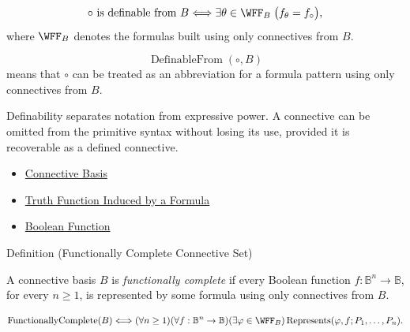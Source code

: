 \begin{remark*}
\[
\circ\text{ is definable from }B
\Longleftrightarrow
\exists\theta\in\WFF_B\;\bigl(f_{\theta}=f_{\circ}\bigr),
\]
where \(\WFF_B\) denotes the formulas built using only connectives from \(B\).
\end{remark*}

\begin{remark*}
\[
  \operatorname{DefinableFrom}(\circ,B)
\] means that \(\circ\) can be treated as
an abbreviation for a formula pattern using only connectives from \(B\).
\end{remark*}

\begin{remark*}[Interpretation]
Definability separates notation from expressive power. A connective can be
omitted from the primitive syntax without losing its use, provided it is
recoverable as a defined connective.
\end{remark*}

\begin{dependencies}
\begin{itemize}
  \item \hyperref[def:connective-basis-propositional-logic]{Connective Basis}
  \item \hyperref[def:truth-function-induced-by-formula]{Truth Function Induced by a Formula}
  \item \hyperref[def:boolean-function-propositional-logic]{Boolean Function}
\end{itemize}
\end{dependencies}

\begin{definitionbox}{Definition (Functionally Complete Connective Set)}
\begin{definition}
\label{def:functionally-complete-connective-set-propositional-logic}
A connective basis \(B\) is \emph{functionally complete} if every Boolean
function \(f:\mathbb{B}^n\to\mathbb{B}\), for every \(n\ge 1\), is represented
by some formula using only connectives from \(B\).
\end{definition}
\end{definitionbox}

\begin{remark*}
\[
\operatorname{FunctionallyComplete}(B)
\Longleftrightarrow
(\forall n\ge 1)(\forall f:\mathbb{B}^n\to\mathbb{B})(\exists\varphi\in\WFF_B)
\operatorname{Represents}(\varphi,f;P_1,\ldots,P_n).
\]
\end{remark*}

